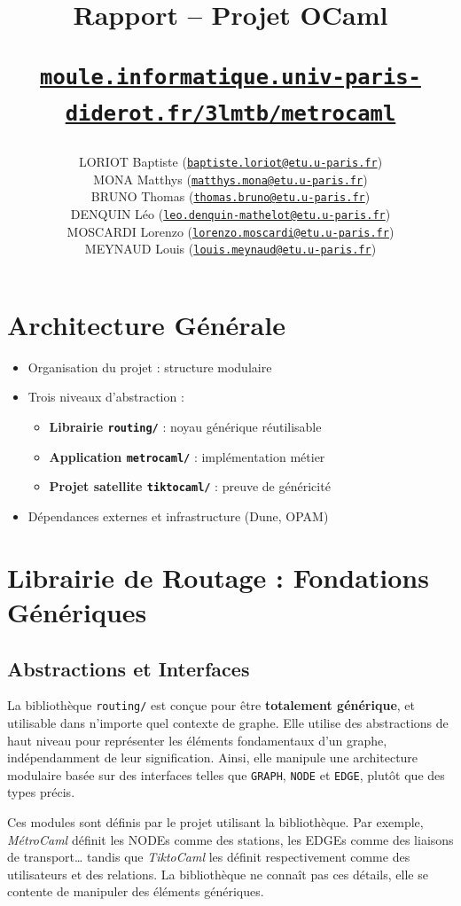\documentclass[12pt,a4paper]{article}
\title{\textbf{Rapport -- Projet OCaml}

\large \href{https://moule.informatique.univ-paris-diderot.fr/3lmtb/metrocaml}{\texttt{moule.informatique.univ-paris-diderot.fr/3lmtb/metrocaml}}}
\author{
    LORIOT Baptiste (\href{mailto:baptiste.loriot@etu.u-paris.fr}{\texttt{baptiste.loriot@etu.u-paris.fr}}) \\
    MONA Matthys (\href{mailto:matthys.mona@etu.u-paris.fr}{\texttt{matthys.mona@etu.u-paris.fr}}) \\
    BRUNO Thomas (\href{mailto:thomas.bruno@etu.u-paris.fr}{\texttt{thomas.bruno@etu.u-paris.fr}}) \\
    DENQUIN Léo (\href{mailto:leo.denquin-mathelot@etu.u-paris.fr}{\texttt{leo.denquin-mathelot@etu.u-paris.fr}}) \\
    MOSCARDI Lorenzo (\href{mailto:lorenzo.moscardi@etu.u-paris.fr}{\texttt{lorenzo.moscardi@etu.u-paris.fr}}) \\
    MEYNAUD Louis (\href{mailto:louis.meynaud@etu.u-paris.fr}{\texttt{louis.meynaud@etu.u-paris.fr}})
}
\date{}
\begin{document}
\maketitle

\section{Architecture Générale}

\begin{itemize}
    \item Organisation du projet : structure modulaire
    \item Trois niveaux d'abstraction :
    \begin{itemize}
        \item \textbf{Librairie \texttt{routing/}} : noyau générique réutilisable
        \item \textbf{Application \texttt{metrocaml/}} : implémentation métier
        \item \textbf{Projet satellite \texttt{tiktocaml/}} : preuve de généricité
    \end{itemize}
    \item Dépendances externes et infrastructure (Dune, OPAM)
\end{itemize}

\section{Librairie de Routage : Fondations Génériques}

\subsection{Abstractions et Interfaces}

La bibliothèque \texttt{routing/} est conçue pour être \textbf{totalement générique}, et utilisable dans n'importe quel contexte de graphe. Elle utilise des abstractions de haut niveau pour représenter les éléments fondamentaux d'un graphe, indépendamment de leur signification. Ainsi, elle manipule une architecture modulaire basée sur des interfaces telles que \texttt{GRAPH}, \texttt{NODE} et \texttt{EDGE}, plutôt que des types précis.

Ces modules sont définis par le projet utilisant la bibliothèque. Par exemple, \textit{MétroCaml} définit les NODEs comme des stations, les EDGEs comme des liaisons de transport\ldots{} tandis que \textit{TiktoCaml} les définit respectivement comme des utilisateurs et des relations. La bibliothèque ne connaît pas ces détails, elle se contente de manipuler des éléments génériques.
\newpage
\end{document}
